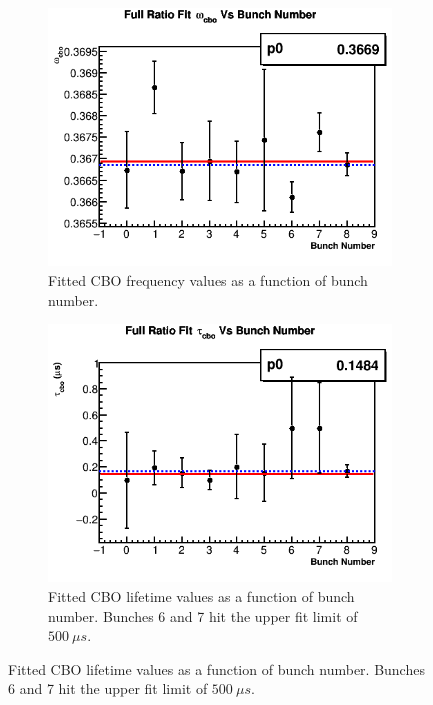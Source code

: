 		\begin{figure}[]
		\centering
		    \begin{subfigure}[t]{0.4\textwidth}
			    \centering
				\includegraphics[width=\textwidth]{RatioCBO_omega_cbo_Vs_BunchNum_Canv}
			    \caption{Fitted CBO frequency values as a function of bunch number.}
		    \end{subfigure}
		    \hspace{4mm}
		    \begin{subfigure}[t]{0.4\textwidth}
			    \centering
				\includegraphics[width=\textwidth]{RatioCBO_tau_cbo_Vs_BunchNum_Canv}
			    \caption{Fitted CBO lifetime values as a function of bunch number. Bunches 6 and 7 hit the upper fit limit of $\SI{500}{\mu s}$.}

\end{subfigure}
\end{figure}
